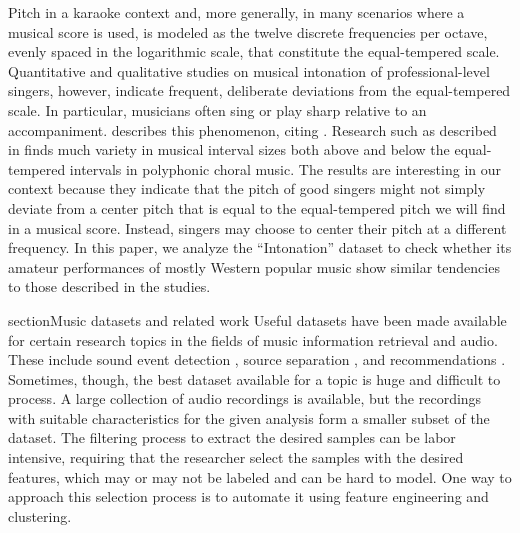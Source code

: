 \begin{appendices}
Pitch in a karaoke context and, more generally, in many scenarios where a musical score is used, is modeled as the twelve discrete frequencies per octave, evenly spaced in the logarithmic scale, that constitute the equal-tempered scale. Quantitative and qualitative studies on musical intonation of professional-level singers, however, indicate frequent, deliberate deviations from the equal-tempered scale. In particular, musicians often sing or play sharp relative to an accompaniment. \cite{parncutt2018psychocultural} describes this phenomenon, citing \cite{barbour1938just, schoen1926pitch, cameron1907tonal}. Research such as described in \cite{devaney2011intonation} finds much variety in musical interval sizes both above and below the equal-tempered intervals in polyphonic choral music. The results are interesting in our context because they indicate that the pitch of good singers might not simply deviate from a center pitch that is equal to the equal-tempered pitch we will find in a musical score. Instead, singers may choose to center their pitch at a different frequency. In this paper, we analyze the ``Intonation'' dataset to check whether its amateur performances of mostly Western popular music show similar tendencies to those described in the studies.

section{Music datasets and related work}
Useful datasets have been made available for certain research topics in the fields of music information retrieval and audio. These include sound event detection \cite{Mesaros2018_DCASE}, source separation \cite{SiSEC17}, and recommendations \cite{bertin2011million}. Sometimes, though, the best dataset available for a topic is huge and difficult to process. A large collection of audio recordings is available, but the recordings with suitable characteristics for the given analysis form a smaller subset of the dataset. The filtering process to extract the desired samples can be labor intensive, requiring that the researcher select the samples with the desired features, which may or may not be labeled and can be hard to model. One way to approach this selection process is to automate it using feature engineering and clustering. 


\end{appendices}
